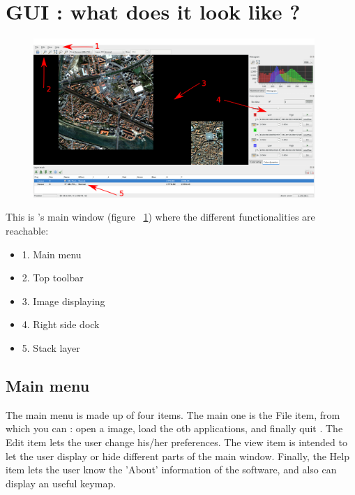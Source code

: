 \section{GUI : what does it look like ?}\label{sec:mongui}


\begin{figure}[!h] 
  \center
  \includegraphics[width=0.95\textwidth]{../Art/MonteverdiImages/gui.png}
  \label{fig:mongui}
\end{figure}

This is \mont's main window (figure ~\ref{fig:mongui}) where the
different functionalities are reachable:

\begin{itemize}
\item 1. Main menu
\item 2. Top toolbar
\item 3. Image displaying
\item 4. Right side dock
\item 5. Stack layer 
\end{itemize}

\subsection{Main menu}
The main menu is made up of four items.
The main one is the File item, from which you can : open a image, load the otb applications, and finally quit \mont.
The Edit item lets the user change his/her preferences. The view item is intended to let the user display or hide different parts of the main window.
Finally, the Help item lets the user know the 'About' information of the software, and also can display an useful keymap.

